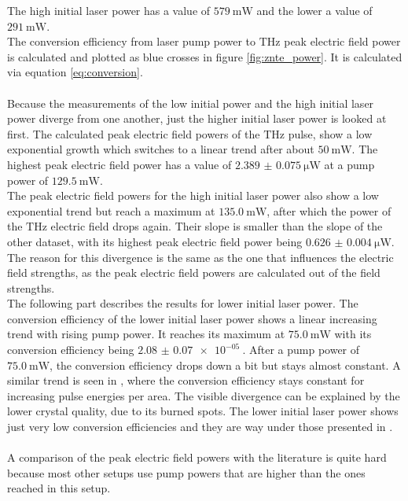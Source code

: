 The high initial laser power has a value of $\SI{579}{\milli\W}$ and the lower a value of $\SI{291}{\milli\W}$.
\\
The conversion efficiency from laser pump power to $\si{\tera\hertz}$ peak electric field power is calculated and plotted as blue crosses in figure \ref{fig:znte_power}.
It is calculated via equation \eqref{eq:conversion}.
\\\\
Because the measurements of the low initial power and the high initial laser power diverge from one another, just the higher initial laser power is looked at first.
The calculated peak electric field powers of the $\si{\tera\hertz}$ pulse, show a low exponential growth which switches to a linear trend after about $\SI{50}{\milli\W}$.
The highest peak electric field power has a value of $\SI{2.389(75)}{\micro\W}$ at a pump power of $\SI{129.5}{\milli\W}$.
\\
The peak electric field powers for the high initial laser power also show a low exponential trend but reach a maximum at $\SI{135.0}{\milli\W}$, after which the power of the $\si{\tera\hertz}$ electric field drops again.
Their slope is smaller than the slope of the other dataset, with its highest peak electric field power being $\SI{0.626(4)}{\micro\W}$.
The reason for this divergence is the same as the one that influences the electric field strengths, as the peak electric field powers are calculated out of the field strengths.
\\
The following part describes the results for lower initial laser power.
The conversion efficiency of the lower initial laser power shows a linear increasing trend with rising pump power.
It reaches its maximum at $\SI{75.0}{\milli\W}$ with its conversion efficiency being $\SI{2.08(7)e-05}{}$.
After a pump power of $\SI{75.0}{\milli\W}$, the conversion efficiency drops down a bit but stays almost constant.
A similar trend is seen in \cite{THZ_eltric_field}, where the conversion efficiency stays constant for increasing pulse energies per area.
The visible divergence can be explained by the lower crystal quality, due to its burned spots.
The lower initial laser power shows just very low conversion efficiencies and they are way under those presented in \cite{THZ_eltric_field}.
\\\\
A comparison of the peak electric field powers with the literature is quite hard because most other setups use pump powers that are higher than the ones reached in this setup.
